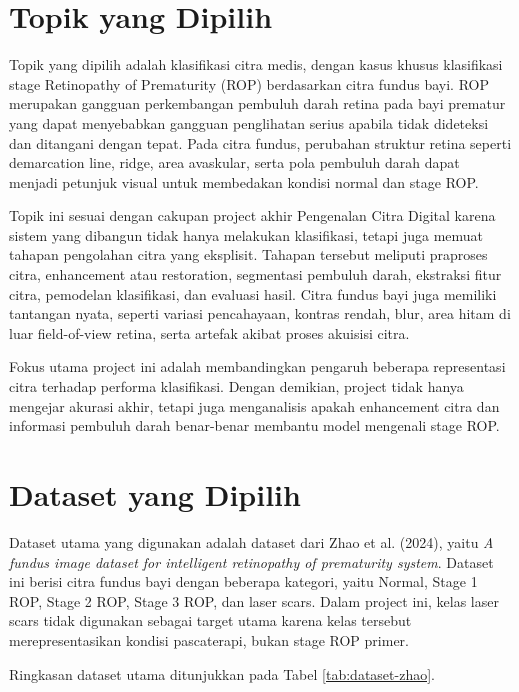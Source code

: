 \documentclass[12pt,a4paper]{article}
\begin{document}
\section*{Topik yang Dipilih}

Topik yang dipilih adalah klasifikasi citra medis, dengan kasus khusus klasifikasi stage Retinopathy of Prematurity (ROP) berdasarkan citra fundus bayi. ROP merupakan gangguan perkembangan pembuluh darah retina pada bayi prematur yang dapat menyebabkan gangguan penglihatan serius apabila tidak dideteksi dan ditangani dengan tepat. Pada citra fundus, perubahan struktur retina seperti demarcation line, ridge, area avaskular, serta pola pembuluh darah dapat menjadi petunjuk visual untuk membedakan kondisi normal dan stage ROP.

Topik ini sesuai dengan cakupan project akhir Pengenalan Citra Digital karena sistem yang dibangun tidak hanya melakukan klasifikasi, tetapi juga memuat tahapan pengolahan citra yang eksplisit. Tahapan tersebut meliputi praproses citra, enhancement atau restoration, segmentasi pembuluh darah, ekstraksi fitur citra, pemodelan klasifikasi, dan evaluasi hasil. Citra fundus bayi juga memiliki tantangan nyata, seperti variasi pencahayaan, kontras rendah, blur, area hitam di luar field-of-view retina, serta artefak akibat proses akuisisi citra.

Fokus utama project ini adalah membandingkan pengaruh beberapa representasi citra terhadap performa klasifikasi. Dengan demikian, project tidak hanya mengejar akurasi akhir, tetapi juga menganalisis apakah enhancement citra dan informasi pembuluh darah benar-benar membantu model mengenali stage ROP.

\section*{Dataset yang Dipilih}

Dataset utama yang digunakan adalah dataset dari Zhao et al. (2024), yaitu \textit{A fundus image dataset for intelligent retinopathy of prematurity system}. Dataset ini berisi citra fundus bayi dengan beberapa kategori, yaitu Normal, Stage 1 ROP, Stage 2 ROP, Stage 3 ROP, dan laser scars. Dalam project ini, kelas laser scars tidak digunakan sebagai target utama karena kelas tersebut merepresentasikan kondisi pascaterapi, bukan stage ROP primer.

Ringkasan dataset utama ditunjukkan pada Tabel \ref{tab:dataset-zhao}.
\end{document}
